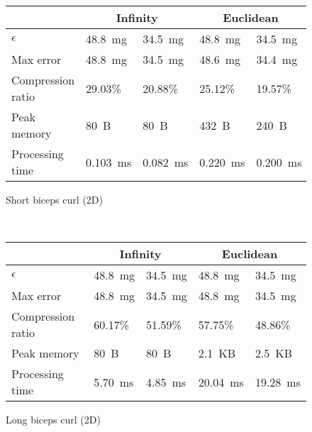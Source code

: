 \documentclass[10pt, conference, compsocconf]{IEEEtran}
\begin{document}
\begin{table}
    \begin{subfigure}{\columnwidth}
    \centering
    \begin{tabular}{l|l|l|l|l}
    \hline
    \rowcolor{headcolor}
                           & \multicolumn{2}{c|}{Infinity} & \multicolumn{2}{c}{Euclidean}\\ \hline
    $\epsilon$                & 48.8~mg          & 34.5~mg  & 48.8~mg         & 34.5~mg \\
    Max error              & 48.8~mg       & 34.5~mg           & 48.6~mg       & 34.4~mg          \\
    Compression ratio      & 29.03\%      & 20.88\%         & 25.12\%     & 19.57\%        \\
    Peak memory            & 80~B          & 80~B             & 432~B        & 240~B           \\
    Processing time        & 0.103~ms      & 0.082~ms         & 0.220~ms     & 0.200~ms        \\ \hline
    \end{tabular}
    \caption{Short biceps curl (2D)}
    \end{subfigure}\\
    \begin{subfigure}{\columnwidth}
    \centering
    \begin{tabular}{l|l|l|l|l}
    \hline
    \rowcolor{headcolor}
                   & \multicolumn{2}{c|}{Infinity} & \multicolumn{2}{c}{Euclidean} \\ \hline
    $\epsilon$             & 48.8~mg        & 34.5~mg    & 48.8~mg        & 34.5~mg    \\
    Max error              & 48.8~mg     & 34.5~mg   &48.8~mg       & 34.5~mg             \\
    Compression ratio      & 60.17\%    & 51.59\%           & 57.75\%    & 48.86\%           \\
    Peak memory       & 80~B        & 80~B               & 2.1~KB      & 2.5~KB             \\
    Processing time      & 5.70~ms     & 4.85~ms            & 20.04~ms    & 19.28~ms           \\ \hline
    \end{tabular}
    \caption{Long biceps curl (2D)}
    \end{subfigure}\\
    \begin{subfigure}{\columnwidth}
    \centering
    \begin{tabular}{l|l|l|l|l}

\end{tabular}
\end{subfigure}
\end{table}
\end{document}
